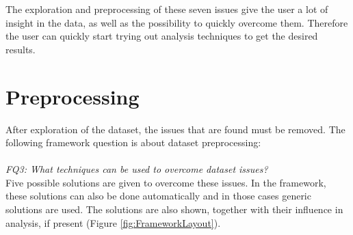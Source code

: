 \documentclass[10pt,a4paper]{report}
\begin{document}
	The exploration and preprocessing of these seven issues give the user a lot of insight in the data, as well as the possibility to quickly overcome them. Therefore the user can quickly start trying out analysis techniques to get the desired results.
	
	\section{Preprocessing}
	\label{FIsec:Preprocessing}
	
	After exploration of the dataset, the issues that are found must be removed. The following framework question is about dataset preprocessing: \\
	\\
	\emph{FQ3: What techniques can be used to overcome dataset issues?} \\
	
	Five possible solutions are given to overcome these issues. In the framework, these solutions can also be done automatically and in those cases generic solutions are used. The solutions are also shown, together with their influence in analysis, if present (Figure \ref{fig:FrameworkLayout}).
	
\end{document}

